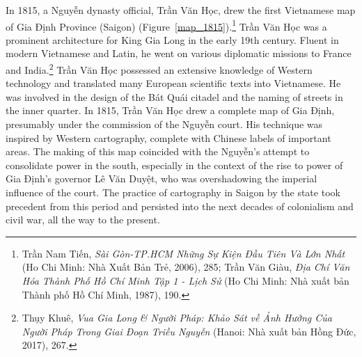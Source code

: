In 1815, a Nguyễn dynasty official, Trần Văn Học, drew the first Vietnamese map of Gia Định Province (Saigon) (Figure~\ref{map_1815}).\footnote{Trần Nam Tiến, \textit{Sài Gòn-TP.HCM Những Sự Kiện Đầu Tiên Và Lớn Nhất} (Ho Chi Minh: Nhà Xuất Bản Trẻ, 2006), 285; Trần Văn Giàu, \textit{Địa Chí Văn Hóa Thành Phố Hồ Chí Minh Tập 1 - Lịch Sử} (Ho Chi Minh: Nhà xuất bản Thành phố Hồ Chí Minh, 1987), 190.} Trần Văn Học was a prominent architecture for King Gia Long in the early 19th century. Fluent in modern Vietnamese and Latin, he went on various diplomatic missions to France and India.\footnote{\vi Thụy Khuê, \textit{Vua Gia Long \& Người Pháp: Khảo Sát về Ảnh Hưởng Của Người Pháp Trong Giai Đoạn Triều Nguyễn} (Hanoi: Nhà xuất bản Hồng Đức, 2017), 267.} Trần Văn Học possessed an extensive knowledge of Western technology and translated many European scientific texts into Vietnamese. He was involved in the design of the Bát Quái citadel and the naming of streets in the inner quarter. In 1815, Trần Văn Học drew a complete map of Gia Định, presumably under the commission of the Nguyễn court. His technique was inspired by Western cartography, complete with Chinese labels of important areas. The making of this map coincided with the Nguyễn’s attempt to consolidate power in the south, especially in the context of the rise to power of Gia Định’s governor Lê Văn Duyệt, who was overshadowing the imperial influence of the court. The practice of cartography in Saigon by the state took precedent from this period and persisted into the next decades of colonialism and civil war, all the way to the present.
\en

\begin{figure}[!ht]
\end{figure}

